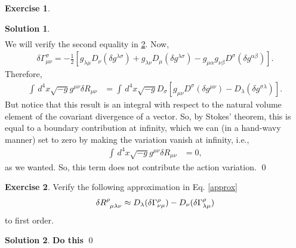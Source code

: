 \documentclass[a4paper,11pt]{article}
\numberwithin{equation}{section}
\theoremstyle{definition}
\newtheorem{exmp}{Exercise}[section]
\newtheorem{sln}{Solution}[section]
\newcommand{\f}[2]{\frac{#1}{#2}}
\newcommand{\lb}{\left[}
\newcommand{\rb}{\right]}
\begin{document}
\begin{exmp}
\begin{sln}
\begin{align}
		\end{align}
		We will verify the second equality in \ref{exer}. Now,
		\begin{align}
		\delta \Gamma^\sigma_{\mu\nu} = -\f{1}{2}\lb g_{\lambda\mu}D_\nu (\delta g^{\lambda\sigma}) + g_{\lambda\nu} D_\mu (\delta g^{\lambda\sigma}) - g_{\mu\alpha}g_{\nu\beta} D^\sigma (\delta g^{\alpha\beta}) \rb.
		\end{align}
		Therefore,
		\begin{align}
		\int \,d^4x \sqrt{-g}g^{\mu\nu}\delta R_{\mu\nu} &= \int\,d^4x \sqrt{-g} D_\sigma \lb g_{\mu\nu}D^\sigma (\delta g^{\mu\nu}) - D_\lambda (\delta g^{\sigma\lambda}) \rb.
		\end{align}
		But notice that this result is an integral with respect to the natural volume element of the covariant divergence of a vector. So, by Stokes' theorem, this is equal to a boundary contribution at infinity, which we can (in a hand-wavy manner) set to zero by making the variation vanish at infinity, i.e., 
		\begin{align}
		\int \,d^4x \sqrt{-g}g^{\mu\nu}\delta R_{\mu\nu} &= 0,
		\end{align}
		as we wanted. So, this term does not contribute the action variation.  \qed \\
		
		
		
		
	\end{sln}
\end{exmp}

\begin{exmp}\label{exer}
	Verify the following approximation in Eq. \eqref{approx}
	\begin{align}
	\delta \tensor{R}{^\rho_{\mu\lambda\nu}} \approx D_\lambda (\delta \Gamma^\rho_{\nu\mu}) - D_\nu (\delta \Gamma^\rho_{\lambda\mu})
	\end{align}
	to first order.\\
	
	\begin{sln}
		\textbf{Do this} \qed\\
	\end{sln}
\end{exmp}
\end{document}
